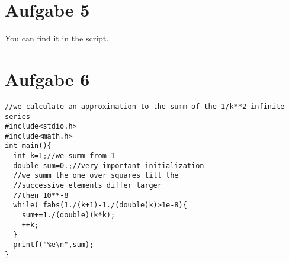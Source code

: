 \documentclass{article}[12pt]
\begin{document}
\section{Aufgabe 5}
You can find it in the script.
\section{Aufgabe 6}
\begin{lstlisting}
//we calculate an approximation to the summ of the 1/k**2 infinite series
#include<stdio.h>
#include<math.h>
int main(){
  int k=1;//we summ from 1
  double sum=0.;//very important initialization
  //we summ the one over squares till the 
  //successive elements differ larger
  //then 10**-8
  while( fabs(1./(k+1)-1./(double)k)>1e-8){
    sum+=1./(double)(k*k);
    ++k;
  }
  printf("%e\n",sum);
}
\end{lstlisting}
\end{document}
